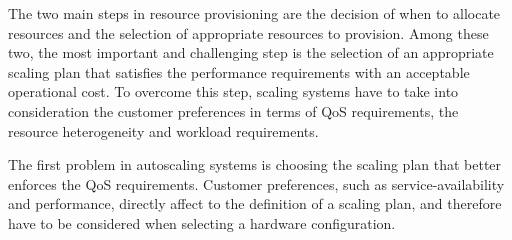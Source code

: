 

The two main steps in resource provisioning are the decision of when to allocate resources and the selection of appropriate resources to provision.
Among these two, the most important and challenging step is the selection of an appropriate scaling plan that satisfies the performance requirements with an acceptable operational cost. 
To overcome this step, scaling systems have to take into consideration the customer preferences in terms of QoS requirements, the resource heterogeneity and workload requirements.

The first problem in autoscaling systems is choosing the scaling plan that better enforces the QoS requirements. Customer preferences, such as service-availability and performance, directly affect to the definition of a scaling plan, and therefore have to be considered when selecting a hardware configuration.




